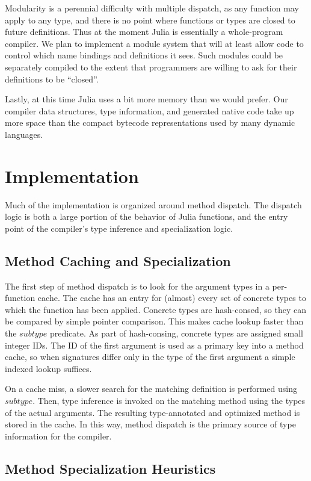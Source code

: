 \documentclass[9pt]{sigplanconf}
\begin{document}
Modularity is a perennial difficulty with multiple dispatch, as any
function may apply to any type, and there is no point where functions or
types are closed to future definitions. Thus at the moment Julia is
essentially a whole-program compiler. We plan to implement a module system
that will at least allow code to control which name bindings and definitions
it sees. Such modules could be separately compiled to the extent that
programmers are willing to ask for their definitions to be ``closed''.

Lastly, at this time Julia uses a bit more memory than we would prefer.
Our compiler data structures, type information, and generated native code
take up more space than the compact bytecode representations used by many
dynamic languages.

\section{Implementation}

Much of the implementation is organized around method dispatch. The dispatch
logic is both a large portion of the behavior of Julia functions, and the
entry point of the compiler's type inference and specialization logic.

\subsection{Method Caching and Specialization}

The first step of method dispatch is to look for the argument types in a
per-function cache. The cache has an entry for (almost) every set of concrete
types to which the function has been applied. Concrete types are hash-consed,
so they can be compared by simple pointer comparison. This makes cache lookup
faster than the $subtype$ predicate. As part of hash-consing, concrete types
are assigned small integer IDs. The ID of the first argument is used as a
primary key into a method cache, so when signatures differ only in the
type of the first argument a simple indexed lookup suffices.

On a cache miss, a slower search for the matching definition is performed using
$subtype$.
Then, type inference is invoked on the matching method using the types
of the actual arguments. The resulting type-annotated and optimized method is
stored in the cache. In this way, method dispatch is the primary source of type
information for the compiler.

\subsection{Method Specialization Heuristics}
\end{document}
